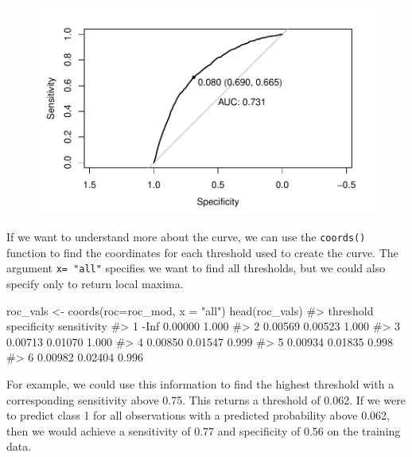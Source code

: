 \documentclass[
  letterpaper,
]{krantz}
\makeatletter
\newenvironment{Shaded}{\begin{snugshade}}{\end{snugshade}}
\newcommand{\AttributeTok}[1]{\textcolor[rgb]{0.40,0.45,0.13}{#1}}
\newcommand{\CommentTok}[1]{\textcolor[rgb]{0.37,0.37,0.37}{#1}}
\newcommand{\FunctionTok}[1]{\textcolor[rgb]{0.28,0.35,0.67}{#1}}
\newcommand{\NormalTok}[1]{\textcolor[rgb]{0.00,0.23,0.31}{#1}}
\newcommand{\OtherTok}[1]{\textcolor[rgb]{0.00,0.23,0.31}{#1}}
\newcommand{\StringTok}[1]{\textcolor[rgb]{0.13,0.47,0.30}{#1}}
\newenvironment{kframe}{%
\medskip{}
\setlength{\fboxsep}{.8em}
 \def\at@end@of@kframe{}%
 \ifinner\ifhmode%
  \def\at@end@of@kframe{\end{minipage}}%
  \begin{minipage}{\columnwidth}%
 \fi\fi%
 \def\FrameCommand##1{\hskip\@totalleftmargin \hskip-\fboxsep
 \colorbox{shadecolor}{##1}\hskip-\fboxsep
     \hskip-\linewidth \hskip-\@totalleftmargin \hskip\columnwidth}%
 \MakeFramed {\advance\hsize-\width
   \@totalleftmargin\z@ \linewidth\hsize
   \@setminipage}}%
 {\par\unskip\endMakeFramed%
 \at@end@of@kframe}
\renewenvironment{Shaded}{\begin{kframe}}{\end{kframe}}
\makeatother
\begin{document}
\begin{figure}[H]

{\centering \includegraphics[width=1\textwidth,height=\textheight]{book/11_logistic_regression_files/figure-pdf/unnamed-chunk-10-1.pdf}

}

\end{figure}

If we want to understand more about the curve, we can use the
\texttt{coords()} function to find the coordinates for each threshold
used to create the curve. The argument \texttt{x=\ "all"} specifies we
want to find all thresholds, but we could also specify only to return
local maxima.

\begin{Shaded}
\begin{Highlighting}[]
\NormalTok{roc\_vals }\OtherTok{\textless{}{-}} \FunctionTok{coords}\NormalTok{(}\AttributeTok{roc=}\NormalTok{roc\_mod, }\AttributeTok{x =} \StringTok{"all"}\NormalTok{)}
\FunctionTok{head}\NormalTok{(roc\_vals)}
\CommentTok{\#\textgreater{}   threshold specificity sensitivity}
\CommentTok{\#\textgreater{} 1      {-}Inf     0.00000       1.000}
\CommentTok{\#\textgreater{} 2   0.00569     0.00523       1.000}
\CommentTok{\#\textgreater{} 3   0.00713     0.01070       1.000}
\CommentTok{\#\textgreater{} 4   0.00850     0.01547       0.999}
\CommentTok{\#\textgreater{} 5   0.00934     0.01835       0.998}
\CommentTok{\#\textgreater{} 6   0.00982     0.02404       0.996}
\end{Highlighting}
\end{Shaded}

For example, we could use this information to find the highest threshold
with a corresponding sensitivity above 0.75. This returns a threshold of
0.062. If we were to predict class 1 for all observations with a
predicted probability above 0.062, then we would achieve a sensitivity
of 0.77 and specificity of 0.56 on the training data.
\end{document}
